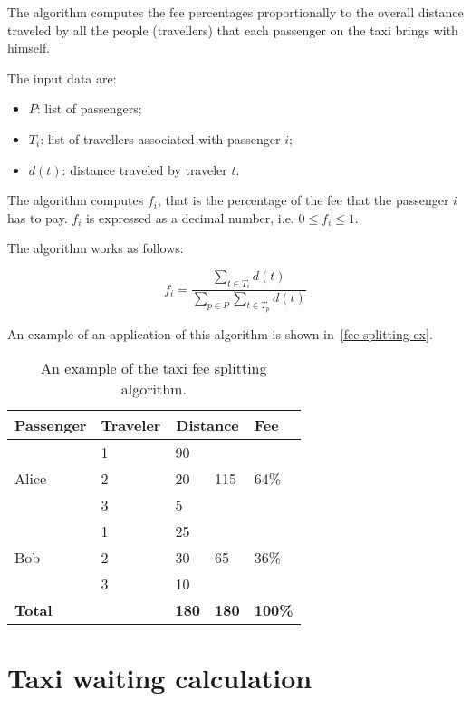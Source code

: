 The algorithm computes the fee percentages proportionally to the overall distance traveled by all the people (travellers) that each passenger on the taxi brings with himself.

The input data are:
\begin{itemize}
    \item $P$: list of passengers;
    \item $T_i$: list of travellers associated with passenger $i$;
    \item $d(t)$: distance traveled by traveler $t$.
\end{itemize}

The algorithm computes $f_i$, that is the percentage of the fee that the passenger $i$ has to pay.
$f_i$ is expressed as a decimal number, i.e. $0 \le f_i \le 1$.

The algorithm works as follows:

\begin{equation}
    f_i = \dfrac
        {\displaystyle \sum_{t \in T_i} d(t)}
        {\displaystyle \sum_{p \in P} \sum_{t \in T_p} d(t)}
\end{equation}

An example of an application of this algorithm is shown in~\autoref{fee-splitting-ex}.

\begin{table}
\begin{center}
\begin{tabular}{ l  l  l  l  l }
    \hline
    \textbf{Passenger} & \textbf{Traveler} & \multicolumn{2}{c}{\textbf{Distance}} & \textbf{Fee} \\
    \hline
    \multirow{3}{*}{Alice} & 1 & 90 & \multirow{3}{*}{115} & \multirow{3}{*}{64\%} \\
    & 2 & 20 & & \\
    & 3 & 5 & & \\
    \hline
    \multirow{3}{*}{Bob} & 1 & 25 & \multirow{3}{*}{65} & \multirow{3}{*}{36\%} \\
    & 2 & 30 & & \\
    & 3 & 10 & & \\
    \hline
    \textbf{Total} & & \textbf{180} & \textbf{180} & \textbf{100\%} \\
    \hline
\end{tabular}
\caption{An example of the taxi fee splitting algorithm.}
\label{fee-splitting-ex}
\end{center}
\end{table}

\section{Taxi waiting calculation}
